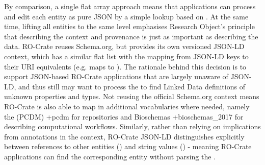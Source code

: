 {}By comparison, a single flat  array approach means that applications can process and edit each entity as pure JSON by a simple lookup based on . At the same time, lifting all entities to the same level emphasises Research Object's principle that describing the context and provenance is just as important as describing the data.\markdownRendererInterblockSeparator
{}RO-Crate reuses Schema.org, but provides its own versioned JSON-LD context, which has a similar flat list with the mapping from JSON-LD keys to their URI equivalents (e.g.  maps to ). The rationale behind this decision is to support JSON-based RO-Crate applications that are largely unaware of JSON-LD, and thus still may want to process the  to find Linked Data definitions of unknown properties and types. Not reusing the official Schema.org context means RO-Crate is also able to map in additional vocabularies where needed, namely the  (PCDM) +{}{}{pcdm} for repositories and Bioschemas +{}{}{bioschemas_2017} for describing computational workflows.\markdownRendererInterblockSeparator
{}Similarly, rather than relying on implications from  annotations in the context, RO-Crate JSON-LD distinguishes explicitly between references to other entities () and string values () - meaning RO-Crate applications can find the corresponding entity without parsing the .\relax
